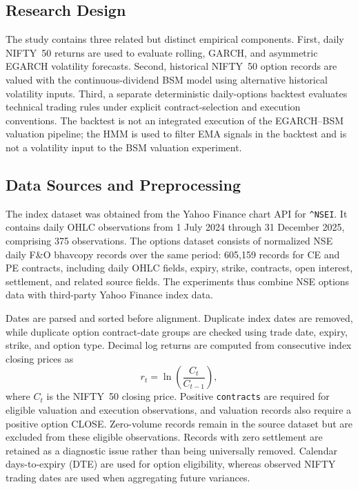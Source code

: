 \documentclass[journal]{IEEEtran}
\begin{document}
\subsection{Research Design}

The study contains three related but distinct empirical components. First, daily NIFTY~50 returns are used to evaluate rolling, GARCH, and asymmetric EGARCH volatility forecasts. Second, historical NIFTY~50 option records are valued with the continuous-dividend BSM model using alternative historical volatility inputs. Third, a separate deterministic daily-options backtest evaluates technical trading rules under explicit contract-selection and execution conventions. The backtest is not an integrated execution of the EGARCH--BSM valuation pipeline; the HMM is used to filter EMA signals in the backtest and is not a volatility input to the BSM valuation experiment.

\subsection{Data Sources and Preprocessing}

The index dataset was obtained from the Yahoo Finance chart API for \texttt{\string^NSEI}. It contains daily OHLC observations from 1 July 2024 through 31 December 2025, comprising 375 observations. The options dataset consists of normalized NSE daily F\&O bhavcopy records over the same period: 605,159 records for CE and PE contracts, including daily OHLC fields, expiry, strike, contracts, open interest, settlement, and related source fields. The experiments thus combine NSE options data with third-party Yahoo Finance index data.

Dates are parsed and sorted before alignment. Duplicate index dates are removed, while duplicate option contract-date groups are checked using trade date, expiry, strike, and option type. Decimal log returns are computed from consecutive index closing prices as
\begin{equation}
r_t=\ln\left(\frac{C_t}{C_{t-1}}\right),
\end{equation}
where $C_t$ is the NIFTY~50 closing price. Positive \texttt{contracts} are required for eligible valuation and execution observations, and valuation records also require a positive option CLOSE. Zero-volume records remain in the source dataset but are excluded from these eligible observations. Records with zero settlement are retained as a diagnostic issue rather than being universally removed. Calendar days-to-expiry (DTE) are used for option eligibility, whereas observed NIFTY trading dates are used when aggregating future variances.
\end{document}
